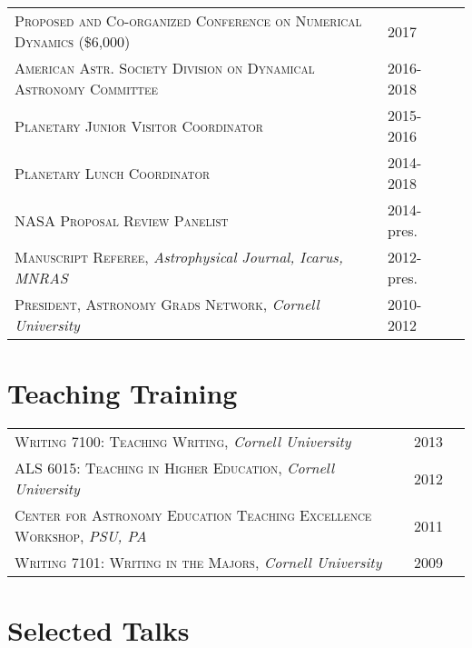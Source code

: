 \documentclass[10pt]{article} %
\begin{document}
\begin{tabular}{l>{\hfill}p{3.0cm}r}
\textsc{Proposed and Co-organized Conference on Numerical Dynamics} \footnotesize(\$6,000)\normalsize & 2017 \\
\textsc{American Astr. Society Division on Dynamical Astronomy Committee} & 2016-2018 \\
\textsc{Planetary Junior Visitor Coordinator} & 2015-2016 \\
\textsc{Planetary Lunch Coordinator} & 2014-2018 \\
\textsc{NASA Proposal Review Panelist} & 2014-pres.\\
\textsc{Manuscript Referee}, {\it Astrophysical Journal, Icarus, MNRAS} & 2012-pres.\\
\textsc{President, Astronomy Grads Network}, {\it Cornell University} & 2010-2012\\
\end{tabular}


\section{Teaching Training}

\begin{tabular}{l>{\hfill}p{2.1cm}r}
\textsc{Writing 7100:  Teaching Writing}, {\it Cornell University} & 2013 \\
\textsc{ALS 6015:  Teaching in Higher Education}, {\it Cornell University} & 2012\\
\textsc{Center for Astronomy Education Teaching Excellence Workshop}, {\it PSU, PA} & 2011 \\
\textsc{Writing 7101: Writing in the Majors}, {\it Cornell University} & 2009 \\
\end{tabular}


\section{Selected Talks}
\end{document}
